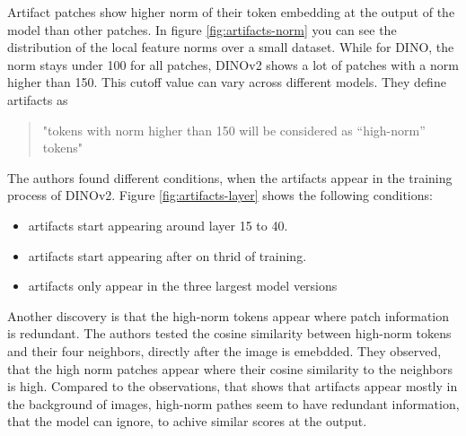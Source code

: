\documentclass[conference]{IEEEtran}
\begin{document}
  Artifact patches show higher norm of their token embedding at the output of the model than other patches. In figure \ref{fig:artifacts-norm} you can see the distribution of the local feature norms over a small dataset. While for \mbox{DINO}, the norm stays under 100 for all patches, \mbox{DINOv2} shows a lot of patches with a norm higher than 150. This cutoff value can vary across different models. They define artifacts as
  \begin{quote}
    "tokens with norm higher than 150 will be considered as “high-norm” tokens" \cite{registers}
  \end{quote}

  The authors found different conditions, when the artifacts appear in the training process of \mbox{DINOv2}. Figure \ref{fig:artifacts-layer} shows the following conditions:
  \begin{itemize}
    \item artifacts start appearing around layer 15 to 40.
    \item artifacts start appearing after on thrid of training.
    \item artifacts only appear in the three largest model versions
  \end{itemize}


  Another discovery is that the high-norm tokens appear where patch information is redundant. The authors tested the cosine similarity between high-norm tokens and their four neighbors, directly after the image is emebdded. They observed, that the high norm patches appear where their cosine similarity to the neighbors is high. Compared to the observations, that shows that artifacts appear mostly in the background of images, high-norm pathes seem to have redundant information, that the model can ignore, to achive similar scores at the output.
\end{document}
